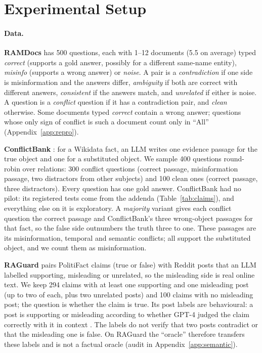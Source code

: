 \section{Experimental Setup}
\label{sec:setup}

\paragraph{Data.}
\textbf{RAMDocs} \citep{wang2025madam} has 500 questions, each with 1--12 documents (5.5 on average) typed
\emph{correct} (supports a gold answer, possibly for a different same-name entity), \emph{misinfo} (supports a wrong
answer) or \emph{noise}. A pair is a \emph{contradiction} if one side is misinformation and the answers differ,
\emph{ambiguity} if both are correct with different answers, \emph{consistent} if the answers match, and
\emph{unrelated} if either is noise. A question is a \emph{conflict} question if it has a contradiction pair, and
\emph{clean} otherwise. Some documents typed \emph{correct} contain a wrong answer; questions whose only sign of
conflict is such a document count only in ``All'' (Appendix~\ref{app:repro}).

\textbf{ConflictBank} \citep{su2024conflictbank}: for a Wikidata fact, an LLM writes one evidence passage for the true
object and one for a substituted object. We sample 400 questions round-robin over relations: 300 conflict questions
(correct passage, misinformation passage, two distractors from other subjects) and 100 clean ones (correct passage,
three distractors). Every question has one gold answer. ConflictBank had no pilot: its registered tests come from the addenda (Table~\ref{tab:claims}), and everything else on it is exploratory. A
\emph{majority} variant gives each conflict question the correct passage and ConflictBank's three wrong-object
passages for that fact, so the false side outnumbers the truth three to one. These passages are its misinformation, temporal
and semantic conflicts; all support the substituted object, and we count them as misinformation.

\textbf{RAGuard} \citep{zeng2025raguard} pairs PolitiFact claims (true or false) with Reddit posts that an LLM
labelled supporting, misleading or unrelated, so the misleading side is real online text. We keep 294 claims with at
least one supporting and one misleading post (up to two of each, plus two unrelated posts) and 100 claims with no
misleading post; the question is whether the claim is true. Its post labels are behavioural: a post is supporting or misleading according to whether GPT-4 judged the claim correctly with it in context \citep[\S3.3]{zeng2025raguard}. The labels do not verify that two posts contradict or that the misleading one is false. On RAGuard the ``oracle'' therefore transfers these labels and is not a factual oracle (audit in Appendix~\ref{app:semantic}).

